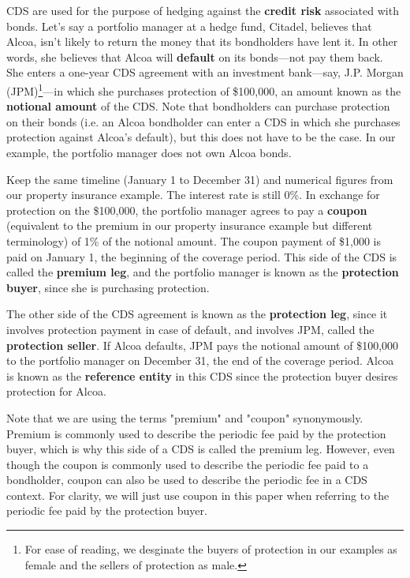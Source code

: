 \documentclass{jss}
\begin{document}
CDS are used for the purpose of hedging against the \textbf{credit risk} associated with bonds. Let's say a portfolio manager at a hedge fund, Citadel, believes that Alcoa, isn't likely to return the money that its bondholders have lent it. In other words, she believes that Alcoa will \textbf{default} on its bonds---not pay them back. She enters a one-year CDS agreement with an investment bank---say, J.P. Morgan (JPM)\footnote{For ease of reading, we desginate the buyers of protection in our examples as female and the sellers of protection as male.}---in which she purchases protection of \$100,000, an amount known as the \textbf{notional amount} of the CDS. Note that bondholders can purchase protection on their bonds (i.e. an Alcoa bondholder can enter a CDS in which she purchases protection against Alcoa's default), but this does not have to be the case. In our example, the portfolio manager does not own Alcoa bonds. 

Keep the same timeline (January 1 to December 31) and numerical figures from our property insurance example. The interest rate is still 0\%. In exchange for protection on the \$100,000, the portfolio manager agrees to pay a \textbf{coupon} (equivalent to the premium in our property insurance example but different terminology) of 1\% of the notional amount. The coupon payment of \$1,000 is paid on January 1, the beginning of the coverage period. This side of the CDS is called the \textbf{premium leg}, and the portfolio manager is known as the \textbf{protection buyer}, since she is purchasing protection.

The other side of the CDS agreement is known as the \textbf{protection leg}, since it involves protection payment in case of default, and involves JPM, called the \textbf{protection seller}. If Alcoa defaults, JPM pays the notional amount of \$100,000 to the portfolio manager on December 31, the end of the coverage period. Alcoa is known as the \textbf{reference entity} in this CDS since the protection buyer desires protection for Alcoa. 

Note that we are using the terms "premium" and "coupon" synonymously. Premium is commonly used to describe the periodic fee paid by the protection buyer, which is why this side of a CDS is called the premium leg. However, even though the coupon is commonly used to describe the periodic fee paid to a bondholder, coupon can also be used to describe the periodic fee in a CDS context. For clarity, we will just use coupon in this paper when referring to the periodic fee paid by the protection buyer.
\end{document}
